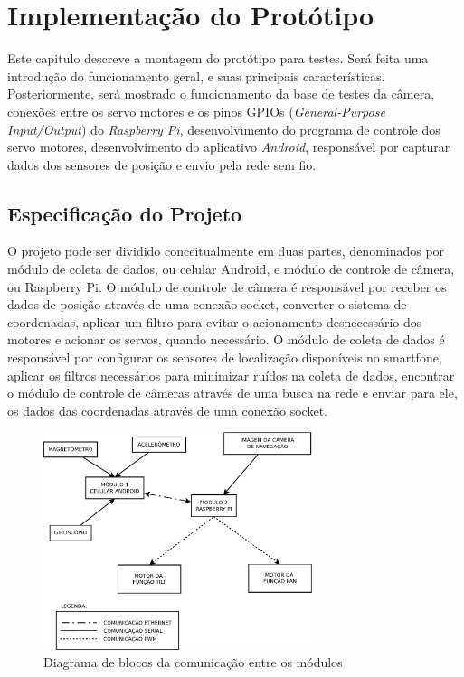 
\chapter{Implementação do Protótipo}
\label{chap:prototipo}

Este capitulo descreve a montagem do protótipo para testes. Será feita uma introdução do funcionamento geral, e suas principais características. Posteriormente, será mostrado o funcionamento da base de testes da câmera, conexões entre os servo motores e os pinos GPIOs (\textit{General-Purpose Input/Output}) do \textit{Raspberry Pi}, desenvolvimento do programa de controle dos servo motores, desenvolvimento do aplicativo \textit{Android}, responsável por capturar dados dos sensores de posição e envio pela rede sem fio.

\section{Especificação do Projeto}
\label{sec:especificacao}

O projeto pode ser dividido conceitualmente em duas partes, denominados por módulo de coleta de dados, ou celular Android, e módulo de controle de câmera, ou Raspberry Pi. O módulo de controle de câmera é responsável por receber os dados de posição através de uma conexão socket, converter o sistema de coordenadas, aplicar um filtro para evitar o acionamento desnecessário dos motores e acionar os servos, quando necessário. O módulo de coleta de dados é responsável por configurar os sensores de localização disponíveis no smartfone, aplicar os filtros necessários para minimizar ruídos na coleta de dados, encontrar o módulo de controle de câmeras através de uma busca na rede e enviar para ele, os dados das coordenadas através de uma conexão socket. \par

\begin{figure}[H]
	\centering
	\includegraphics[width=0.7\textwidth]{figuras/diagrama-modulos-eps-converted-to.pdf}
	\caption{Diagrama de blocos da comunicação entre os módulos}
	\label{fig:diagrama_blocos}
\end{figure}

